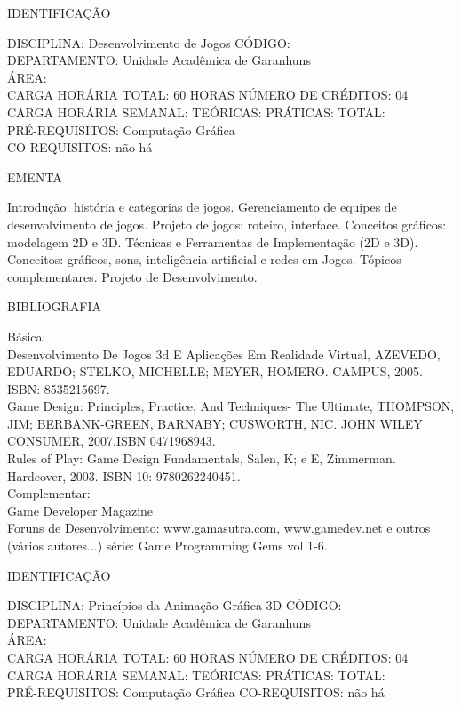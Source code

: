\documentclass[
	12pt,				%
	openright,			%
  oneside,     %
	a4paper,			%
	english,			%
	french,				%
	spanish,			%
	brazil				%
	]{abntex2}
\begin{document}
\begin{apendicesenv}
\newpage IDENTIFICAÇÃO

DISCIPLINA: Desenvolvimento de Jogos CÓDIGO:\\ 
DEPARTAMENTO: Unidade Acadêmica de Garanhuns\\ 
ÁREA: \\
CARGA HORÁRIA TOTAL: 60 HORAS NÚMERO DE CRÉDITOS: 04\\
CARGA HORÁRIA SEMANAL: TEÓRICAS: PRÁTICAS: TOTAL: \\
PRÉ-REQUISITOS: Computação Gráfica\\
CO-REQUISITOS: não há

EMENTA 

Introdução: história e categorias de jogos. Gerenciamento de equipes de
desenvolvimento de jogos. Projeto de jogos: roteiro, interface.
Conceitos gráficos: modelagem 2D e 3D. Técnicas e Ferramentas de
Implementação (2D e 3D). Conceitos: gráficos, sons, inteligência
artificial e redes em Jogos. Tópicos complementares. Projeto de
Desenvolvimento.

BIBLIOGRAFIA 

Básica:\\
Desenvolvimento De Jogos 3d E Aplicações Em Realidade Virtual, AZEVEDO,
EDUARDO; STELKO, MICHELLE; MEYER, HOMERO. CAMPUS, 2005. ISBN:
8535215697.\\
Game Design: Principles, Practice, And Techniques- The Ultimate,
THOMPSON, JIM; BERBANK-GREEN, BARNABY; CUSWORTH, NIC. JOHN WILEY
CONSUMER, 2007.ISBN 0471968943.\\
Rules of Play: Game Design Fundamentals, Salen, K; e E, Zimmerman.
Hardcover, 2003. ISBN-10: 9780262240451.\\
Complementar:\\
Game Developer Magazine\\
Foruns de Desenvolvimento: www.gamasutra.com, www.gamedev.net e outros\\
(vários autores...) série: Game Programming Gems vol 1-6.

\newpage IDENTIFICAÇÃO

DISCIPLINA: Princípios da Animação Gráfica 3D CÓDIGO:\\ 
DEPARTAMENTO: Unidade Acadêmica de Garanhuns\\ 
ÁREA: \\
CARGA HORÁRIA TOTAL: 60 HORAS NÚMERO DE CRÉDITOS: 04\\
CARGA HORÁRIA SEMANAL: TEÓRICAS: PRÁTICAS: TOTAL: \\
PRÉ-REQUISITOS: Computação Gráfica
CO-REQUISITOS: não há


\end{apendicesenv}
\end{document}
